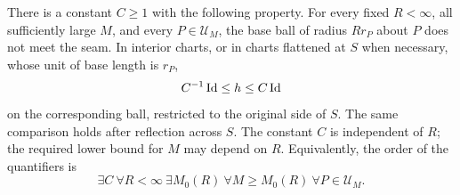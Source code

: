 \begin{lemma}
\label{lem:unsafe-blowup}
There is a constant \(C\ge1\) with the following property.  For every
fixed \(R<\infty\), all sufficiently large \(M\), and every
\(P\in\mathcal U_M\), the base ball of radius \(Rr_P\) about \(P\)
does not meet the seam.  In interior charts, or in charts flattened at
\(S\) when necessary, whose unit of base length is \(r_P\),
\begin{equation}
 C^{-1}\operatorname{Id}\le h\le C\operatorname{Id}
 \label{eq:unsafe-uniform-metric}
\end{equation}
on the corresponding ball, restricted to the original side of \(S\).
The same comparison holds after reflection across \(S\).  The constant
\(C\) is independent of \(R\); the required lower bound for \(M\)
may depend on \(R\).  Equivalently, the order of the quantifiers is
\begin{equation}
 \exists C\ \forall R<\infty\ \exists M_0(R)\
 \forall M\ge M_0(R)\ \forall P\in\mathcal U_M.
 \label{eq:unsafe-quantifiers}
\end{equation}
\end{lemma}

